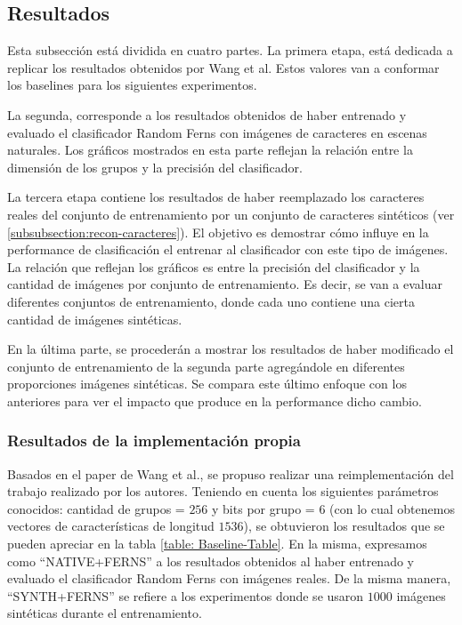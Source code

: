 \newpage
\subsection{Resultados}

\label{subsection:resultados}

	Esta subsección está dividida en cuatro partes. La primera etapa, está dedicada a replicar los resultados obtenidos por Wang et al. Estos valores van a conformar los baselines para los siguientes experimentos.

	La segunda, corresponde a los resultados obtenidos de haber entrenado y evaluado el clasificador Random Ferns con imágenes de caracteres en escenas naturales. Los gráficos mostrados en esta parte reflejan la relación entre la dimensión de los grupos y la precisión del clasificador.

	La tercera etapa contiene los resultados de haber reemplazado los caracteres reales del conjunto de entrenamiento por un conjunto de caracteres sintéticos (ver \ref{subsubsection:recon-caracteres}). El objetivo es demostrar cómo influye en la performance de clasificación el entrenar al clasificador con este tipo de imágenes. La relación que reflejan los gráficos es entre la precisión del clasificador y la cantidad de imágenes por conjunto de entrenamiento. Es decir, se van a evaluar diferentes conjuntos de entrenamiento, donde cada uno contiene una cierta cantidad de imágenes sintéticas.

	En la última parte, se procederán a mostrar los resultados de haber modificado el conjunto de entrenamiento de la segunda parte agregándole en diferentes proporciones imágenes sintéticas. Se compara este último enfoque con los anteriores para ver el impacto que produce en la performance dicho cambio.

	\subsubsection{Resultados de la implementación propia}
	\label{subsubsection: baseline-propio}

	Basados en el paper de Wang et al., se propuso realizar una reimplementación del trabajo realizado por los autores. Teniendo en cuenta los siguientes parámetros conocidos: cantidad de grupos = $256$ y bits por grupo = $6$ (con lo cual obtenemos vectores de características de longitud $1536$), se obtuvieron los resultados que se pueden apreciar en la tabla \ref{table: Baseline-Table}. En la misma, expresamos como ``NATIVE+FERNS'' a los resultados obtenidos al haber entrenado y evaluado el clasificador Random Ferns con imágenes reales. De la misma manera, ``SYNTH+FERNS'' se  refiere a los experimentos donde se usaron $1000$ imágenes sintéticas durante el entrenamiento.

